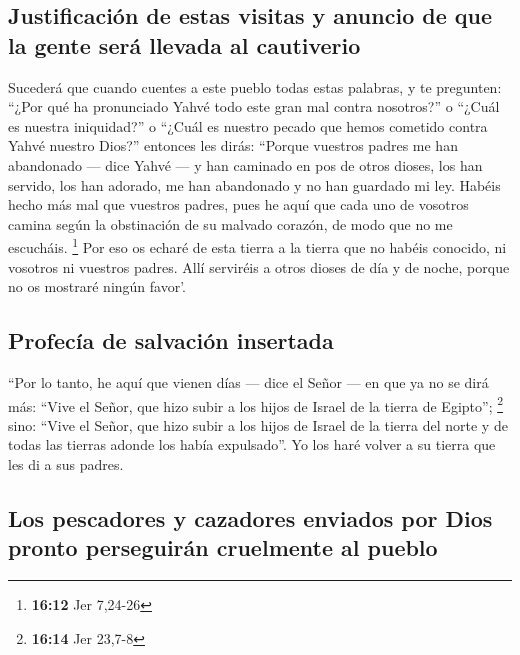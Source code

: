 \begin{paracol}{2}
\hypertarget{justificaciuxf3n-de-estas-visitas-y-anuncio-de-que-la-gente-seruxe1-llevada-al-cautiverio}{%
\subsection{Justificación de estas visitas y anuncio de que la gente
será llevada al
cautiverio}\label{justificaciuxf3n-de-estas-visitas-y-anuncio-de-que-la-gente-seruxe1-llevada-al-cautiverio}}

 Sucederá que cuando cuentes a este pueblo todas estas
palabras, y te pregunten: ``¿Por qué ha pronunciado Yahvé todo este gran
mal contra nosotros?'' o ``¿Cuál es nuestra iniquidad?'' o ``¿Cuál es
nuestro pecado que hemos cometido contra Yahvé nuestro Dios?''
 entonces les dirás: ``Porque vuestros padres me han
abandonado --- dice Yahvé --- y han caminado en pos de otros dioses, los
han servido, los han adorado, me han abandonado y no han guardado mi
ley.  Habéis hecho más mal que vuestros padres, pues he
aquí que cada uno de vosotros camina según la obstinación de su malvado
corazón, de modo que no me escucháis. \footnote{\textbf{16:12} Jer
  7,24-26}  Por eso os echaré de esta tierra a la tierra
que no habéis conocido, ni vosotros ni vuestros padres. Allí serviréis a
otros dioses de día y de noche, porque no os mostraré ningún favor'.

\hypertarget{profecuxeda-de-salvaciuxf3n-insertada}{%
\subsection{Profecía de salvación
insertada}\label{profecuxeda-de-salvaciuxf3n-insertada}}

 ``Por lo tanto, he aquí que vienen días --- dice el
Señor --- en que ya no se dirá más: ``Vive el Señor, que hizo subir a
los hijos de Israel de la tierra de Egipto''; \footnote{\textbf{16:14}
  Jer 23,7-8}  sino: ``Vive el Señor, que hizo subir a
los hijos de Israel de la tierra del norte y de todas las tierras adonde
los había expulsado''. Yo los haré volver a su tierra que les di a sus
padres.

\hypertarget{los-pescadores-y-cazadores-enviados-por-dios-pronto-perseguiruxe1n-cruelmente-al-pueblo}{%
\subsection{Los pescadores y cazadores enviados por Dios pronto
perseguirán cruelmente al
pueblo}\label{los-pescadores-y-cazadores-enviados-por-dios-pronto-perseguiruxe1n-cruelmente-al-pueblo}}


\end{paracol}
